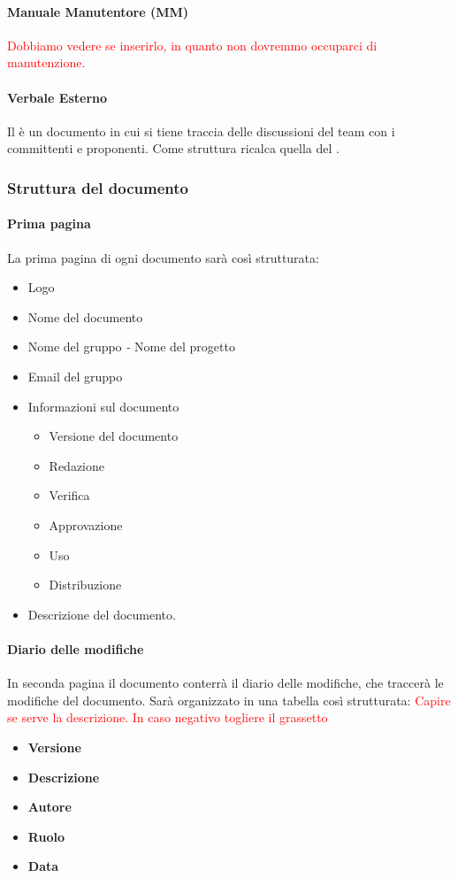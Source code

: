 \paragraph{Manuale Manutentore (MM)}
\textcolor{red}{Dobbiamo vedere se inserirlo, in quanto non dovremmo occuparci di manutenzione.}
\paragraph{Verbale Esterno}
Il \VE{} è un documento in cui si tiene traccia delle discussioni del team con i committenti e proponenti. Come struttura ricalca quella del \VI.
\subsubsection{Struttura del documento}
\paragraph{Prima pagina}
La prima pagina di ogni documento sarà così strutturata:
\begin{itemize}
	\item Logo
	\item Nome del documento
	\item Nome del gruppo \emph{-} Nome del progetto
	\item Email del gruppo
	\item Informazioni sul documento
	\begin{itemize}
		\item Versione del documento
		\item Redazione
		\item Verifica
		\item Approvazione
		\item Uso
		\item Distribuzione
	\end{itemize}
	\item Descrizione del documento.
\end{itemize}
\paragraph{Diario delle modifiche}
In seconda pagina il documento conterrà il diario delle modifiche, che traccerà le modifiche del documento. Sarà organizzato in una tabella così strutturata:
\textcolor{red}{Capire se serve la descrizione. In caso negativo togliere il grassetto}
\begin{itemize}
	\item \textbf{Versione}
	\item \textbf{Descrizione}
	\item \textbf{Autore}
	\item \textbf{Ruolo}
	\item \textbf{Data}
\end{itemize}
